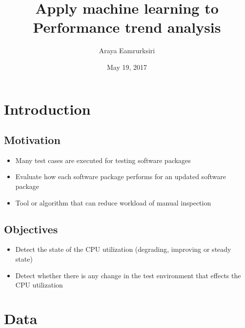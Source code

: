 \documentclass{beamer}
\title[Master Thesis]{Apply machine learning to Performance trend analysis} %
\author{Araya Eamrurksiri}
\institute[LiU] %
{
Linkoping university \\ %
\medskip
\textit{} %
}
\date{May 19, 2017}
\begin{document}
\begin{frame}
\titlepage %
\end{frame}



\section{Introduction} 
\subsection{Motivation}
\begin{frame}

\begin{itemize}
	\item Many test cases are executed for testing software packages 
	\item Evaluate how each software package performs for an updated software package
	\item Tool or algorithm that can reduce workload of manual inspection
\end{itemize}	

\end{frame}
\subsection{Objectives}
\begin{frame}
\begin{itemize}
	\item Detect the state of the CPU utilization (degrading, improving or steady state)
	\item Detect whether there is any change in the test environment that effects the CPU utilization
\end{itemize}
\end{frame}

\section{Data}
\end{document}
